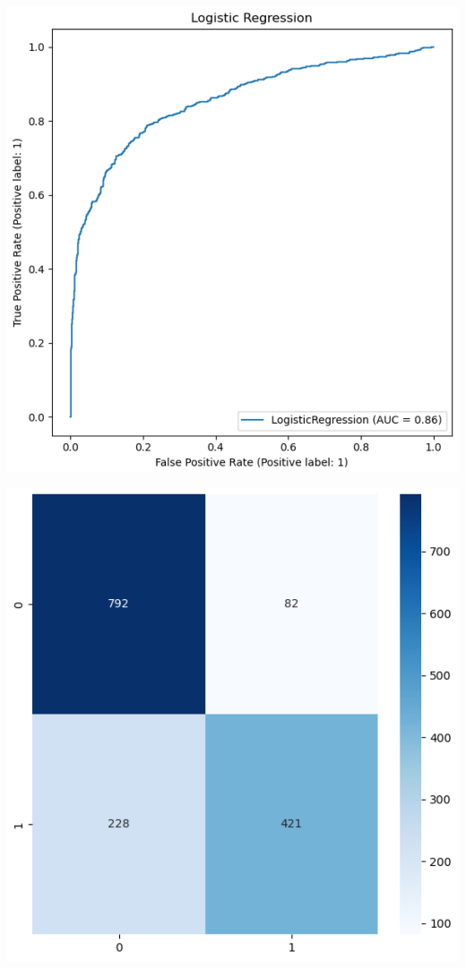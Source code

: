 \documentclass[11pt]{diazessay} %
\begin{document}
\begin{minipage}[t]{.45\linewidth}
\includegraphics[width=\linewidth]{images/lr_plot.png}
\end{minipage}\hfill
\begin{minipage}[b]{.45\linewidth}
\includegraphics[width=\linewidth]{images/lr_heatmap.png}
\end{minipage}\hfill
\end{document}
